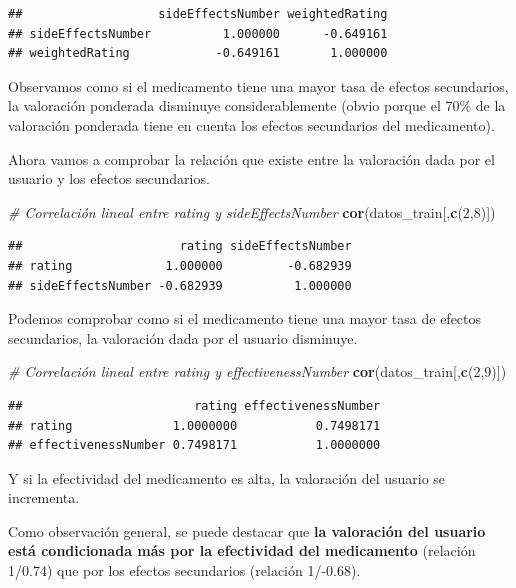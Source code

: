 \documentclass[spanish,]{article}
\newenvironment{Shaded}{\begin{snugshade}}{\end{snugshade}}
\newcommand{\KeywordTok}[1]{\textcolor[rgb]{0.13,0.29,0.53}{\textbf{#1}}}
\newcommand{\DecValTok}[1]{\textcolor[rgb]{0.00,0.00,0.81}{#1}}
\newcommand{\CommentTok}[1]{\textcolor[rgb]{0.56,0.35,0.01}{\textit{#1}}}
\newcommand{\NormalTok}[1]{#1}
\begin{document}
\begin{verbatim}
##                   sideEffectsNumber weightedRating
## sideEffectsNumber          1.000000      -0.649161
## weightedRating            -0.649161       1.000000
\end{verbatim}

Observamos como si el medicamento tiene una mayor tasa de efectos
secundarios, la valoración ponderada disminuye considerablemente (obvio
porque el 70\% de la valoración ponderada tiene en cuenta los efectos
secundarios del medicamento).

Ahora vamos a comprobar la relación que existe entre la valoración dada
por el usuario y los efectos secundarios.

\begin{Shaded}
\begin{Highlighting}[]
\CommentTok{# Correlación lineal entre rating y sideEffectsNumber}
\KeywordTok{cor}\NormalTok{(datos_train[,}\KeywordTok{c}\NormalTok{(}\DecValTok{2}\NormalTok{,}\DecValTok{8}\NormalTok{)])}
\end{Highlighting}
\end{Shaded}

\begin{verbatim}
##                      rating sideEffectsNumber
## rating             1.000000         -0.682939
## sideEffectsNumber -0.682939          1.000000
\end{verbatim}

Podemos comprobar como si el medicamento tiene una mayor tasa de efectos
secundarios, la valoración dada por el usuario disminuye.

\begin{Shaded}
\begin{Highlighting}[]
\CommentTok{# Correlación lineal entre rating y effectivenessNumber}
\KeywordTok{cor}\NormalTok{(datos_train[,}\KeywordTok{c}\NormalTok{(}\DecValTok{2}\NormalTok{,}\DecValTok{9}\NormalTok{)])}
\end{Highlighting}
\end{Shaded}

\begin{verbatim}
##                        rating effectivenessNumber
## rating              1.0000000           0.7498171
## effectivenessNumber 0.7498171           1.0000000
\end{verbatim}

Y si la efectividad del medicamento es alta, la valoración del usuario
se incrementa.

Como observación general, se puede destacar que \textbf{la valoración
del usuario está condicionada más por la efectividad del medicamento}
(relación 1/0.74) que por los efectos secundarios (relación 1/-0.68).
\end{document}
